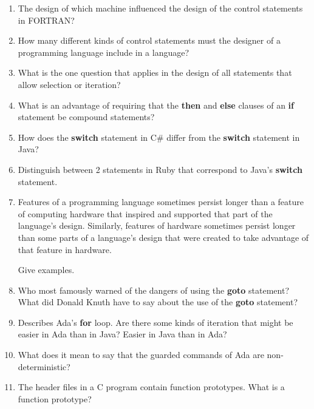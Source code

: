 \begin{enumerate}
  \item The design of which machine influenced the design
    of the control statements in FORTRAN?

  \item How many different kinds of control statements
    must the designer of a programming language include
    in a language?

  \item What is the one question that applies in the
    design of all statements that allow selection or
    iteration?

  \item What is an advantage of requiring that
    the \textbf{then} and \textbf{else} clauses of
    an \textbf{if} statement be compound statements?

  \item How does the \textbf{switch} statement in C\#
    differ from the \textbf{switch} statement in Java?

  \item Distinguish between 2 statements in Ruby
    that correspond to Java's \textbf{switch} statement.

  \item Features of a programming language sometimes persist
    longer than a feature of computing hardware that inspired
    and supported that part of the language's design.
    Similarly, features of hardware sometimes persist longer
    than some parts of a language's design that were created
    to take advantage of that feature in hardware.

    Give examples.

  \item Who most famously warned of the dangers of using the
    \textbf{goto} statement? What did Donald Knuth have to
    say about the use of the \textbf{goto} statement?

  \item Describes Ada's \textbf{for} loop. Are there some
    kinds of iteration that might be easier in Ada than
    in Java? Easier in Java than in Ada?

  \item What does it mean to say that the guarded commands
    of Ada are non-deterministic?

  \item The header files in a C program contain function
    prototypes. What is a function prototype?


\end{enumerate}
